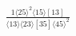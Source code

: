 \documentclass[varwidth, border=5pt]{standalone}
\begin{document}
\begin{my}
$\begin{gathered}
\scriptscriptstyle\frac{1⟨25⟩^2⟨15⟩[13]}{⟨13⟩⟨23⟩[35]⟨45⟩^2}
\end{gathered}$
\end{my}
\end{document}
